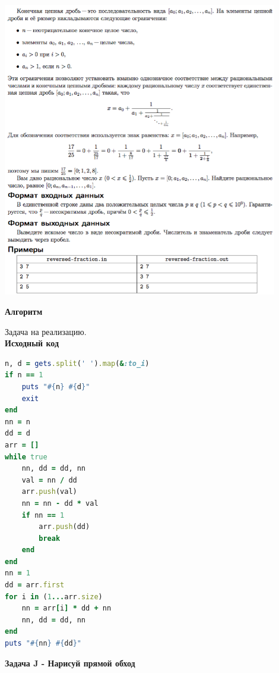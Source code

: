 \documentclass[a4paper,12pt]{article}
\begin{document}
\begin{center}
\includegraphics[width=0.9\textwidth]{OC_Baltics/G.png}\\ [1cm]
\end{center}

\textbf{{\large Алгоритм}}

Задача на реализацию. \\
\newpage
\textbf{{\large Исходный код}} \\
\begin{lstlisting}[language=Ruby]
n, d = gets.split(' ').map(&:to_i)
if n == 1
    puts "#{n} #{d}"
    exit
end
nn = n
dd = d
arr = []
while true
    nn, dd = dd, nn
    val = nn / dd
    arr.push(val)
    nn = nn - dd * val
    if nn == 1
        arr.push(dd)
        break
    end
end
nn = 1
dd = arr.first
for i in (1...arr.size)
    nn = arr[i] * dd + nn
    nn, dd = dd, nn
end
puts "#{nn} #{dd}"
\end{lstlisting}


\newpage
\textbf{{\large Задача J - Нарисуй прямой обход}}
\end{document}
